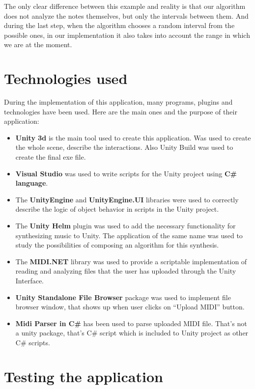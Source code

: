 \documentclass[thesis=B,english]{FITthesis}[2019/12/23]
\begin{document}
The only clear difference between this example and reality is that our algorithm does not analyze the notes themselves, but only the intervals between them. And during the last step, when the algorithm chooses a random interval from the possible ones, in our implementation it also takes into account the range in which we are at the moment.

\clearpage

\section{Technologies used}

During the implementation of this application, many programs, plugins and technologies have been used. Here are the main ones and the purpose of their application:

\begin{itemize}
    \item \textbf{Unity 3d} is the main tool used to create this application. Was used to create the whole scene, describe the interactions. Also Unity Build was used to create the final exe file.
    \item \textbf{Visual Studio} was used to write scripts for the Unity project using \textbf{C\# language}.
    \item The \textbf{UnityEngine} and \textbf{UnityEngine.UI} libraries were used to correctly describe the logic of object behavior in scripts in the Unity project.
    \item The \textbf{Unity Helm} plugin was used to add the necessary functionality for synthesizing music to Unity. The application of the same name was used to study the possibilities of composing an algorithm for this synthesis.
    \item The \textbf{MIDI.NET} library was used to provide a scriptable implementation of reading and analyzing files that the user has uploaded through the Unity Interface.
    \item \textbf{Unity Standalone File Browser} package was used to implement file browser window, that shows up when user clicks on “Upload MIDI” button.
    \item \textbf{Midi Parser in C\#} has been used to parse uploaded MIDI file. That's not a unity package, that's C\# script which is included to Unity project as other C\# scripts.
\end{itemize}

\clearpage

\section{Testing the application}
\end{document}
